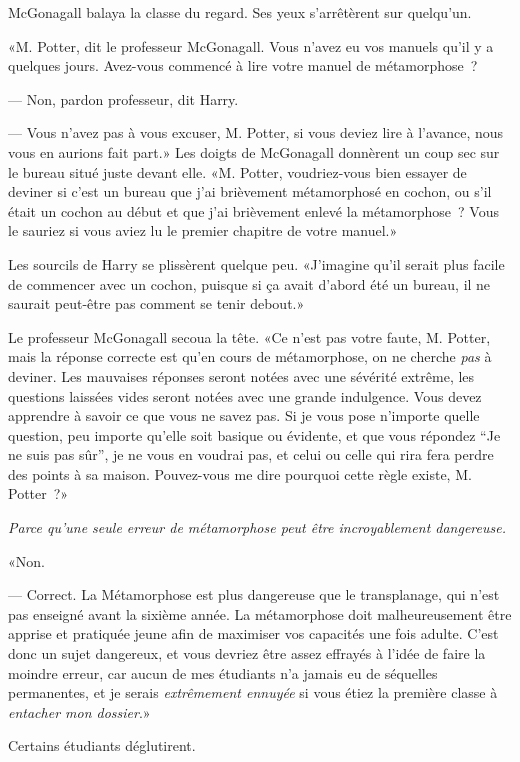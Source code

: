 McGonagall balaya la classe du regard. Ses yeux s'arrêtèrent sur quelqu'un.

«M. Potter, dit le professeur McGonagall. Vous n'avez eu vos manuels qu'il y a quelques jours. Avez-vous commencé à lire votre manuel de métamorphose~?

--- Non, pardon professeur, dit Harry.

--- Vous n'avez pas à vous excuser, M. Potter, si vous deviez lire à l'avance, nous vous en aurions fait part.» Les doigts de McGonagall donnèrent un coup sec sur le bureau situé juste devant elle. «M. Potter, voudriez-vous bien essayer de deviner si c'est un bureau que j'ai brièvement métamorphosé en cochon, ou s'il était un cochon au début et que j'ai brièvement enlevé la métamorphose~? Vous le sauriez si vous aviez lu le premier chapitre de votre manuel.»

Les sourcils de Harry se plissèrent quelque peu. «J'imagine qu'il serait plus facile de commencer avec un cochon, puisque si ça avait d'abord été un bureau, il ne saurait peut-être pas comment se tenir debout.»

Le professeur McGonagall secoua la tête. «Ce n'est pas votre faute, M. Potter, mais la réponse correcte est qu'en cours de métamorphose, on ne cherche \emph{pas} à deviner. Les mauvaises réponses seront notées avec une sévérité extrême, les questions laissées vides seront notées avec une grande indulgence. Vous devez apprendre à savoir ce que vous ne savez pas. Si je vous pose n'importe quelle question, peu importe qu'elle soit basique ou évidente, et que vous répondez “Je ne suis pas sûr”, je ne vous en voudrai pas, et celui ou celle qui rira fera perdre des points à sa maison. Pouvez-vous me dire pourquoi cette règle existe, M. Potter~?»

\emph{Parce qu'une seule erreur de métamorphose peut être incroyablement dangereuse.}

«Non.

--- Correct. La Métamorphose est plus dangereuse que le transplanage, qui n'est pas enseigné avant la sixième année. La métamorphose doit malheureusement être apprise et pratiquée jeune afin de maximiser vos capacités une fois adulte. C'est donc un sujet dangereux, et vous devriez être assez effrayés à l'idée de faire la moindre erreur, car aucun de mes étudiants n'a jamais eu de séquelles permanentes, et je serais \emph{extrêmement ennuyée} si vous étiez la première classe à \emph{entacher mon dossier}.»

Certains étudiants déglutirent.


